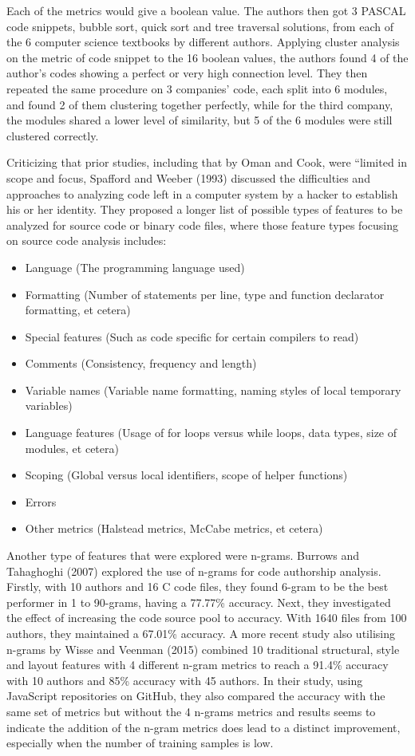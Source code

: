 \documentclass{report}
\begin{document}
Each of the metrics would give a boolean value. The authors then got 3 PASCAL code snippets, bubble sort, quick sort and tree traversal solutions, from each of the 6 computer science textbooks by different authors. Applying cluster analysis on the metric of code snippet to the 16 boolean values, the authors found 4 of the author’s codes showing a perfect or very high connection level. They then repeated the same procedure on 3 companies’ code, each split into 6 modules, and found 2 of them clustering together perfectly, while for the third company, the modules shared a lower level of similarity, but 5 of the 6 modules were still clustered correctly.

Criticizing that prior studies, including that by Oman and Cook, were “limited in scope and focus, Spafford and Weeber (1993) discussed the difficulties and approaches to analyzing code left in a computer system by a hacker to establish his or her identity. They proposed a longer list of possible types of features to be analyzed for source code or binary code files, where those feature types focusing on source code analysis includes:

\begin{itemize}
\item Language (The programming language used)
\item Formatting (Number of statements per line, type and function declarator formatting, et cetera)
\item Special features (Such as code specific for certain compilers to read)
\item Comments (Consistency, frequency and length)
\item Variable names (Variable name formatting, naming styles of local temporary variables)
\item Language features (Usage of for loops versus while loops, data types, size of modules, et cetera)
\item Scoping (Global versus local identifiers, scope of helper functions)
\item Errors
\item Other metrics (Halstead metrics, McCabe metrics, et cetera)
\end{itemize}

Another type of features that were explored were n-grams. Burrows and Tahaghoghi (2007) explored the use of n-grams for code authorship analysis. Firstly, with 10 authors and 16 C code files, they found 6-gram to be the best performer in 1 to 90-grams, having a 77.77\% accuracy. Next, they investigated the effect of increasing the code source pool to accuracy. With 1640 files from 100 authors, they maintained a 67.01\% accuracy. A more recent study also utilising n-grams by Wisse and Veenman (2015) combined 10 traditional structural, style and layout features with 4 different n-gram metrics to reach a 91.4\% accuracy with 10 authors and 85\% accuracy with 45 authors. In their study, using JavaScript repositories on GitHub, they also compared the accuracy with the same set of metrics but without the 4 n-grams metrics and results seems to indicate the addition of the n-gram metrics does lead to a distinct improvement, especially when the number of training samples is low.
\end{document}
